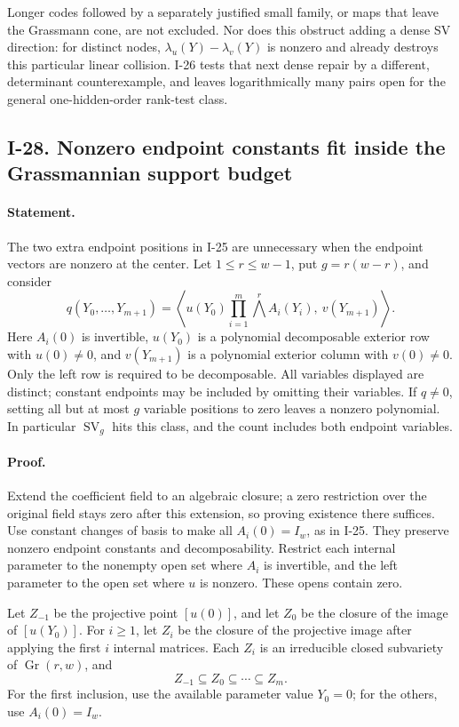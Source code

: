 \documentclass[11pt,a4paper]{article}
\theoremstyle{definition}\newtheorem{definition}{Definition}
\begin{document}
Longer codes followed by a separately justified small family,
or maps that leave the Grassmann cone, are not excluded.
Nor does this obstruct adding a dense SV direction: for
distinct nodes, $\lambda_u(Y)-\lambda_v(Y)$ is nonzero and
already destroys this particular linear collision.  I-26
tests that next dense repair by a different, determinant
counterexample, and leaves logarithmically many pairs open
for the general one-hidden-order rank-test class.


\subsection{I-28. Nonzero endpoint constants fit inside the Grassmannian support budget}
\label{I-28}

\paragraph{Statement.}
The two extra endpoint positions in I-25 are unnecessary when
the endpoint vectors are nonzero at the center.  Let
$1\le r\le w-1$, put $g=r(w-r)$, and consider
\[
 q(Y_0,\ldots,Y_{m+1})
 =\left\langle u(Y_0)
       \prod_{i=1}^m\bigwedge^r A_i(Y_i),\ v(Y_{m+1})\right\rangle.
 \tag{I.39}
\]
Here $A_i(0)$ is invertible, $u(Y_0)$ is a polynomial
decomposable exterior row with $u(0)\ne0$, and $v(Y_{m+1})$
is a polynomial exterior column with $v(0)\ne0$.
Only the left row is required to be decomposable.
All variables displayed are distinct; constant endpoints may
be included by omitting their variables.
If $q\ne0$, setting all but at most $g$ variable positions
to zero leaves a nonzero polynomial.  In particular
$\operatorname{SV}_{g}$ hits this class, and the count includes
both endpoint variables.

\paragraph{Proof.}
Extend the coefficient field to an algebraic closure; a zero
restriction over the original field stays zero after this
extension, so proving existence there suffices.  Use constant
changes of basis to make all $A_i(0)=I_w$, as in I-25.
They preserve nonzero endpoint constants and decomposability.
Restrict each internal parameter to the nonempty open set
where $A_i$ is invertible, and the left parameter to the open
set where $u$ is nonzero.  These opens contain zero.

Let $Z_{-1}$ be the projective point $[u(0)]$, and let $Z_0$
be the closure of the image of $[u(Y_0)]$.  For $i\ge1$,
let $Z_i$ be the closure of the projective image after applying
the first $i$ internal matrices.  Each $Z_i$ is an irreducible
closed subvariety of $\operatorname{Gr}(r,w)$, and
\[
 Z_{-1}\subseteq Z_0\subseteq\cdots\subseteq Z_m.
\]
For the first inclusion, use the available parameter value
$Y_0=0$; for the others, use $A_i(0)=I_w$.
\end{document}
